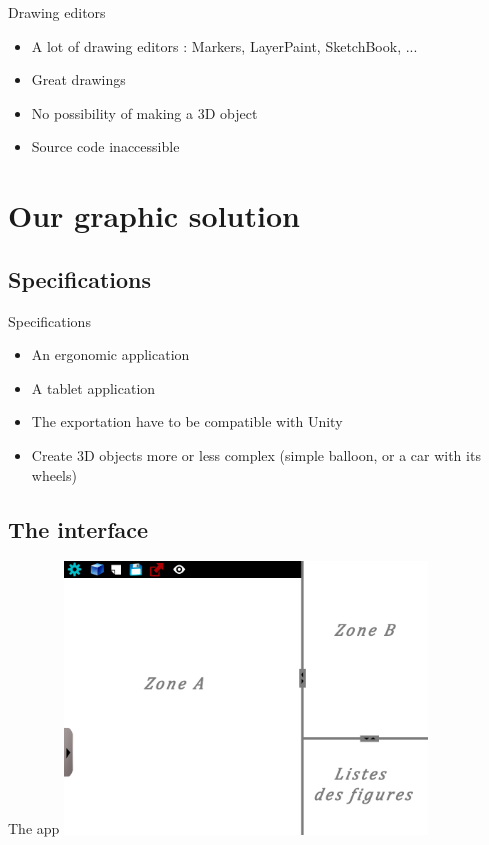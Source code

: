 \documentclass[a4paper,10pt]{beamer}
\begin{document}
			\begin{frame}{Drawing editors}
				\begin{itemize}
					\item A lot of drawing editors : Markers, LayerPaint, SketchBook, ...
					\item Great drawings
					\item No possibility of making a 3D object
					\item Source code inaccessible
				\end{itemize}
			\end{frame}
	
	\section{Our graphic solution}
		\subsection{Specifications}
		
		\begin{frame}{Specifications}
			\begin{itemize}
				\item An ergonomic application
				\item A tablet application
				\item The exportation have to be compatible with Unity
				\item Create 3D objects more or less complex (simple balloon, or a car with its wheels)
			\end{itemize}
		\end{frame}
		
		\subsection{The interface}
		
			\begin{frame}{The app}
				\includegraphics[height=205pt]{maquette/maquette_1.png}
			\end{frame}
			
\end{document}

